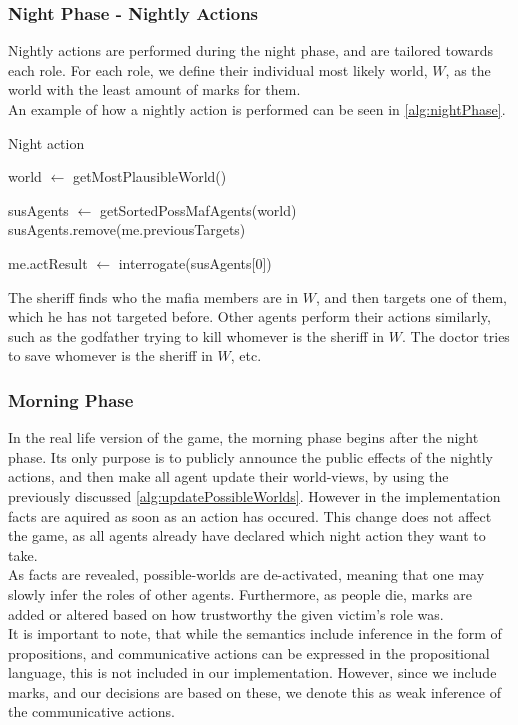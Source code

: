 \subsubsection{Night Phase - Nightly
	Actions}\label{sec:nightPhaseNightlyActions}
Nightly actions are performed during the night phase, and are tailored towards
each role. For each role, we define their individual most likely world, $W$, as
the world with the least amount of marks for them. \\ An example of how a
nightly action is performed can be seen in \cref{alg:nightPhase}.
\begin{algorithm}[H]
	\caption{Night action}
	\begin{algorithmic}[1]
		\State world $\gets$ getMostPlausibleWorld()

		\State susAgents $\gets$ getSortedPossMafAgents(world)
		\State susAgents.remove(me.previousTargets)

		\State me.actResult $\gets$ interrogate(susAgents[0])
		\EndIf
		\EndFunction

		\Statex
	\end{algorithmic}\label{alg:nightPhase}
\end{algorithm}
\setcounter{algorithmcaption}{7}
The sheriff finds who the mafia members are in $W$, and then targets one of
them, which he has not targeted before. Other agents perform their actions
similarly, such as the godfather trying to kill whomever is the sheriff in $W$.
The doctor tries to save whomever is the sheriff in $W$, etc.

\subsubsection{Morning Phase}\label{sec:morningPhase}
In the real life version of the game, the morning phase begins after the night
phase. Its only purpose is to publicly announce the public effects of the
nightly actions, and then make all agent update their world-views, by using the
previously discussed \cref{alg:updatePossibleWorlds}. However in the
implementation facts are aquired as soon as an action has occured. This change
does not affect the game, as all agents already have declared which night
action they want to take.\\ As facts are revealed, possible-worlds are
de-activated, meaning that one may slowly infer the roles of other agents.
Furthermore, as people die, marks are added or altered based on how trustworthy
the given victim's role was. \\ It is important to note, that while the
semantics include inference in the form of propositions, and communicative
actions can be expressed in the propositional language, this is not included in
our implementation. However, since we include marks, and our decisions are
based on these, we denote this as weak inference of the communicative actions.

